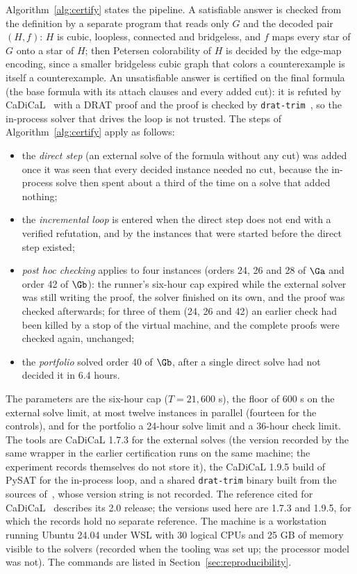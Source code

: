 Algorithm~\ref{alg:certify} states the pipeline. A satisfiable answer is checked from the definition by a separate program that reads only $G$ and the decoded pair $(H,f)$: $H$ is cubic, loopless,
connected and bridgeless, and $f$ maps every star of $G$ onto a star of $H$; then Petersen colorability of $H$ is decided by the edge-map encoding, since a smaller bridgeless cubic graph that colors a
counterexample is itself a counterexample. An unsatisfiable answer is certified on the final formula (the base formula with its attach clauses and every added cut): it is refuted by
CaDiCaL~\cite{CaDiCaL} with a DRAT proof and the proof is checked by \texttt{drat-trim}~\cite{DRATtrim}, so the in-process solver that drives the loop is not trusted. The steps of Algorithm~\ref{alg:certify} apply as follows:
\begin{itemize}
\item the \emph{direct step} (an external solve of the formula without any cut) was added once it was seen that every decided instance needed no cut, because the in-process solve then spent about a third of
the time on a solve that added nothing;
\item the \emph{incremental loop} is entered when the direct step does not end with a verified refutation, and by the instances that were started before the direct step existed;
\item \emph{post hoc checking} applies to four instances (orders 24, 26 and 28 of $\Ga$ and order 42 of $\Gb$): the runner's six-hour cap expired while the external solver was still writing the proof, the solver finished on its own, and
the proof was checked afterwards; for three of them (24, 26 and 42) an earlier check had been killed by a stop of the virtual machine, and the complete proofs were checked again, unchanged;
\item the \emph{portfolio} solved order 40 of $\Gb$, after a single direct solve had not decided it in 6.4 hours.
\end{itemize}
The parameters are the six-hour cap ($T = 21{,}600$ s), the floor of 600 s on the external solve limit, at most twelve instances in parallel (fourteen for the controls), and for the portfolio a 24-hour
solve limit and a 36-hour check limit. The tools are CaDiCaL 1.7.3 for the external solves (the version recorded by the same wrapper in the earlier certification runs on the same machine; the experiment records
themselves do not store it), the CaDiCaL 1.9.5 build of PySAT for the in-process loop, and a shared \texttt{drat-trim} binary built from the sources of~\cite{DRATtrim}, whose version string is not recorded. The reference cited for CaDiCaL~\cite{CaDiCaL} describes its 2.0 release; the versions used here are 1.7.3 and 1.9.5, for which the records hold no separate reference. The machine is a workstation running Ubuntu 24.04 under WSL with 30 logical CPUs
and 25 GB of memory visible to the solvers (recorded when the tooling was set up; the processor model was not). The commands are listed in Section~\ref{sec:reproducibility}.


